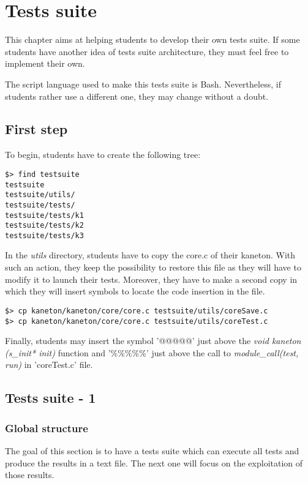 \chapter{Tests suite}
\label{chapter:Tests suite}

This chapter aims at helping students to develop their own tests suite. If some students have another idea of tests suite architecture, they must feel free to implement their own.

The script language used to make this tests suite is Bash. Nevertheless, if students rather use a different one, they may change without a doubt.

\section{First step}
To begin, students have to create the following tree:
\begin{verbatim}
$> find testsuite
testsuite
testsuite/utils/
testsuite/tests/
testsuite/tests/k1
testsuite/tests/k2
testsuite/tests/k3
\end{verbatim}

In the \textit{utils} directory, students have to copy the core.c of their kaneton. With such an action, they keep the possibility to restore this file as they will have to modify it to launch their tests. Moreover, they have to make a second copy in which they will insert symbols to locate the code insertion in the file.

\begin{verbatim}
$> cp kaneton/kaneton/core/core.c testsuite/utils/coreSave.c
$> cp kaneton/kaneton/core/core.c testsuite/utils/coreTest.c
\end{verbatim}

Finally, students may insert the symbol '@@@@@' just above the \textit{void kaneton (s\_init* init)} function and '\%\%\%\%\%'  just above the call to \textit{module\_call(test, run)} in 'coreTest.c' file.

\section{Tests suite - 1}
\subsection{Global structure}
The goal of this section is to have a tests suite which can execute all tests and produce the results in a text file. The next one will focus on the exploitation of those results.

